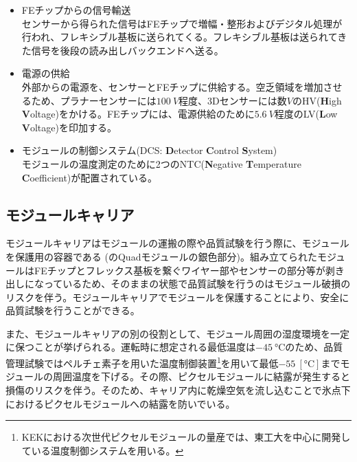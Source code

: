 \begin{itemize}
  \item FEチップからの信号輸送  \\
  センサーから得られた信号はFEチップで増幅・整形およびデジタル処理が行われ、フレキシブル基板に送られてくる。フレキシブル基板は送られてきた信号を後段の読み出しバックエンドへ送る。
  \item 電源の供給 \\
  外部からの電源を、センサーとFEチップに供給する。空乏領域を増加させるため、プラナーセンサーには$100\ \si{V}$程度、3Dセンサーには数$\si{V}$のHV(\textbf{H}igh \textbf{V}oltage)をかける。FEチップには、電源供給のために$5.6\ \si{V}$程度のLV(\textbf{L}ow \textbf{V}oltage)を印加する。
  \item モジュールの制御システム(DCS: \textbf{D}etector \textbf{C}ontrol \textbf{S}ystem) \\
  モジュールの温度測定のために2つのNTC(\textbf{N}egative \textbf{T}emperature \textbf{C}oefficient)が配置されている。
\end{itemize}

\subsection{モジュールキャリア}
\label{sec:carrier}

モジュールキャリアはモジュールの運搬の際や品質試験を行う際に、モジュールを保護用の容器である (のQuadモジュールの銀色部分)。組み立てられたモジュールはFEチップとフレックス基板を繋ぐワイヤー部やセンサーの部分等が剥き出しになっているため、そのままの状態で品質試験を行うのはモジュール破損のリスクを伴う。モジュールキャリアでモジュールを保護することにより、安全に品質試験を行うことができる。

また、モジュールキャリアの別の役割として、モジュール周囲の湿度環境を一定に保つことが挙げられる。運転時に想定される最低温度は$-45\ \si{\degreeCelsius}$のため、品質管理試験ではペルチェ素子を用いた温度制御装置\footnote{KEKにおける次世代ピクセルモジュールの量産では、東工大を中心に開発している温度制御システムを用いる。}を用いて最低$-55\ [\si{\degreeCelsius}]$までモジュールの周囲温度を下げる。その際、ピクセルモジュールに結露が発生すると損傷のリスクを伴う。そのため、キャリア内に乾燥空気を流し込むことで氷点下におけるピクセルモジュールへの結露を防いでいる。

